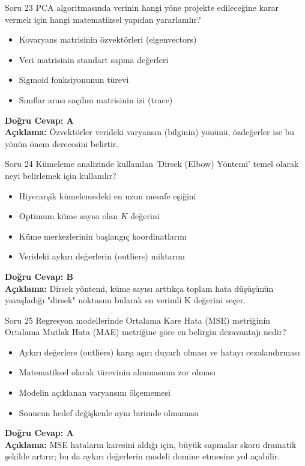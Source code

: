 \documentclass[12pt,a4paper]{article}
\begin{document}
\begin{testcard}{Soru 23}
    PCA algoritmasında verinin hangi yöne projekte edileceğine karar vermek için hangi matematiksel yapıdan yararlanılır?
    \begin{itemize}
        \item[A)] Kovaryans matrisinin özvektörleri (eigenvectors)
        \item[B)] Veri matrisinin standart sapma değerleri
        \item[C)] Sigmoid fonksiyonunun türevi
        \item[D)] Sınıflar arası saçılım matrisinin izi (trace)
    \end{itemize}
    \tcblower
    \textbf{Doğru Cevap: A} \\
    \textbf{Açıklama:} Özvektörler verideki varyansın (bilginin) yönünü, özdeğerler ise bu yönün önem derecesini belirtir.
\end{testcard}

\begin{testcard}{Soru 24}
    Kümeleme analizinde kullanılan 'Dirsek (Elbow) Yöntemi' temel olarak neyi belirlemek için kullanılır?
    \begin{itemize}
        \item[A)] Hiyerarşik kümelemedeki en uzun mesafe eşiğini
        \item[B)] Optimum küme sayısı olan $K$ değerini
        \item[C)] Küme merkezlerinin başlangıç koordinatlarını
        \item[D)] Verideki aykırı değerlerin (outliers) miktarını
    \end{itemize}
    \tcblower
    \textbf{Doğru Cevap: B} \\
    \textbf{Açıklama:} Dirsek yöntemi, küme sayısı arttıkça toplam hata düşüşünün yavaşladığı "dirsek" noktasını bularak en verimli K değerini seçer.
\end{testcard}

\begin{testcard}{Soru 25}
    Regresyon modellerinde Ortalama Kare Hata (MSE) metriğinin Ortalama Mutlak Hata (MAE) metriğine göre en belirgin dezavantajı nedir?
    \begin{itemize}
        \item[A)] Aykırı değerlere (outliers) karşı aşırı duyarlı olması ve hatayı cezalandırması
        \item[B)] Matematiksel olarak türevinin alınmasının zor olması
        \item[C)] Modelin açıklanan varyansını ölçememesi
        \item[D)] Sonucun hedef değişkenle aynı birimde olmaması
    \end{itemize}
    \tcblower
    \textbf{Doğru Cevap: A} \\
    \textbf{Açıklama:} MSE hataların karesini aldığı için, büyük sapmalar skoru dramatik şekilde artırır; bu da aykırı değerlerin modeli domine etmesine yol açabilir.
\end{testcard}
\end{document}
